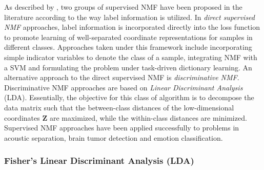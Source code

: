 As described by \cite{Chao2019RecentAdvancesSupervisedDimRed}, two groups of supervised NMF have been proposed in the literature according to the way label information is utilized.  In \textit{direct supervised NMF} approaches, label information is incorporated directly into the loss function to promote learning of well-separated coordinate representations for samples in different classes.  Approaches taken under this framework include incorporating simple indicator variables to denote the class of a sample, integrating NMF with a SVM and formulating the problem under task-driven dictionary learning.  An alternative approach to the direct supervised NMF is \textit{discriminative NMF}.  Discriminative NMF approaches are based on \textit{Linear Discriminant Analysis} (LDA).  Essentially, the objective for this class of algorithm is to decompose the data matrix such that the between-class distances of the low-dimensional coordinates $\bm{Z}$ are maximized, while the within-class distances are minimized.  Supervised NMF approaches have been applied successfully to problems in acoustic separation, brain tumor detection and emotion classification.




\subsubsection{Fisher's Linear Discriminant Analysis (LDA)} \label{sec:LDA}

